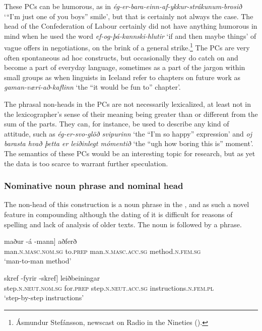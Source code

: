 \documentclass[output=paper]{LSP/langsci}
\begin{document}
\begin{xlist}
These PCs can be 
humorous, as in \textit{ég-er-bara-einn-af-ykkur-strákunum-brosið} ‘“I’m just one of you boys” smile’, but that is certainly not always the case. The head of the  Confederation of Labour certainly did not have anything humorous in mind when he used the word \textit{ef-og-þá-kannski-hlutir} ‘if and then maybe things’ of vague offers in negotiations, on the brink of a general strike.\footnote{Ásmundur Stefánsson, newscast on  Radio in the Nineties (\citealt{Bjarnadóttir19962005}).}  The PCs are very often spontaneous ad hoc constructs, but occasionally they do catch on and become a part of everyday language, sometimes as a part of the jargon within small groups as when linguists in Iceland refer to chapters on future work as \textit{gaman-væri-að-kaflinn} ‘the “it would be fun to” chapter’.

The phrasal non-heads in the PCs are not necessarily lexicalized, at least not in the lexicographer’s sense of their meaning being greater than or different from the sum of the parts. They can, for instance, be used to describe any kind of attitude, such as \textit{ég-er-svo-glöð svipurinn} ‘the “I’m so happy” expression’ and \textit{oj barasta hvað þetta er leiðinlegt mómentið} ‘the “ugh how boring this is” moment’. The semantics of these PCs would be an interesting topic for research, but as yet the  data is too scarce to warrant further speculation.

\subsubsection{Nominative noun phrase and nominal head}\label{sec:bjarnadottir:3.2.1}

The non-head of this construction is a noun phrase in the , and as such a novel feature in  compounding although the dating of it is difficult for reasons of spelling and lack of analysis of older texts. The noun is followed by a  phrase. 

\ea%
 \label{ex:bjarnadottir:23} 
 \ea
 \gll {\ob}maður -á -mann] aðferð\\
man\textsc{.n.masc.nom.sg} to\textsc{.prep} man\textsc{.n.masc.acc.sg} method\textsc{.n.fem.sg}\\
\glt ‘man-to-man method’

\ex
\gll {\ob}skref -fyrir -skref] leiðbeiningar\\
  step\textsc{.n.neut.nom.sg} for\textsc{.prep} step\textsc{.n.neut.acc.sg} instructions\textsc{.n.fem.pl}\\
\glt ‘step-by-step instructions’


\end{xlist}
\end{document}
